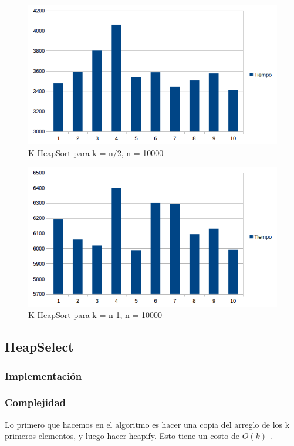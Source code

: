 \begin{figure}[H]
\centering
\includegraphics[width=\textwidth]{KN2/KHeapSortN2.png}
\caption{K-HeapSort para k = n/2, n = 10000}
\end{figure}

\begin{figure}[H]
\centering
\includegraphics[width=\textwidth]{KN/KHeapSortN.png}
\caption{K-HeapSort para k = n-1, n = 10000}
\end{figure}


\newpage

\subsection{HeapSelect}
\subsubsection{Implementación}

\subsubsection{Complejidad}
Lo primero que hacemos en el algoritmo es hacer una copia del arreglo de los k primeros elementos, y luego hacer heapify. Esto tiene un costo de $O(k)$ \cite{STD_MAKEHEAP}.

